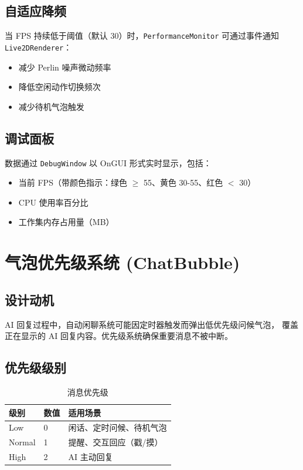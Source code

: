 \documentclass[12pt,a4paper]{ctexart}
\begin{document}
\subsection{自适应降频}

当 FPS 持续低于阈值（默认 30）时，\texttt{PerformanceMonitor} 可通过事件通知 \texttt{Live2DRenderer}：
\begin{itemize}
    \item 减少 Perlin 噪声微动频率
    \item 降低空闲动作切换频次
    \item 减少待机气泡触发
\end{itemize}

\subsection{调试面板}

数据通过 \texttt{DebugWindow} 以 OnGUI 形式实时显示，包括：
\begin{itemize}
    \item 当前 FPS（带颜色指示：绿色 $\ge$ 55、黄色 30-55、红色 $<$ 30）
    \item CPU 使用率百分比
    \item 工作集内存占用量（MB）
\end{itemize}

\section{气泡优先级系统 (ChatBubble)}

\subsection{设计动机}

AI 回复过程中，自动闲聊系统可能因定时器触发而弹出低优先级问候气泡，
覆盖正在显示的 AI 回复内容。优先级系统确保重要消息不被中断。

\subsection{优先级级别}

\begin{table}[H]
\centering
\caption{消息优先级}
\label{tab:msg-priority}
\begin{tabular}{lll}
\toprule
\textbf{级别} & \textbf{数值} & \textbf{适用场景} \\
\midrule
Low    & 0 & 闲话、定时问候、待机气泡 \\
Normal & 1 & 提醒、交互回应（戳/摸） \\
High   & 2 & AI 主动回复 \\
\bottomrule
\end{tabular}
\end{table}
\end{document}
